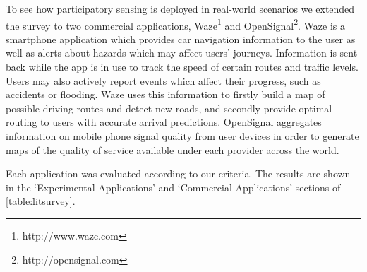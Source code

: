 To see how participatory sensing is deployed in real-world scenarios we extended the survey to two commercial applications, Waze\footnote{http://www.waze.com} and OpenSignal\footnote{http://opensignal.com}. Waze is a smartphone application which provides car navigation information to the user as well as alerts about hazards which may affect users' journeys. Information is sent back while the app is in use to track the speed of certain routes and traffic levels. Users may also actively report events which affect their progress, such as accidents or flooding. Waze uses this information to firstly build a map of possible driving routes and detect new roads, and secondly provide optimal routing to users with accurate arrival predictions. OpenSignal aggregates information on mobile phone signal quality from user devices in order to generate maps of the quality of service available under each provider across the world.

Each application was evaluated according to our criteria. The results are shown in the `Experimental Applications' and `Commercial Applications' sections of \autoref{table:litsurvey}.

